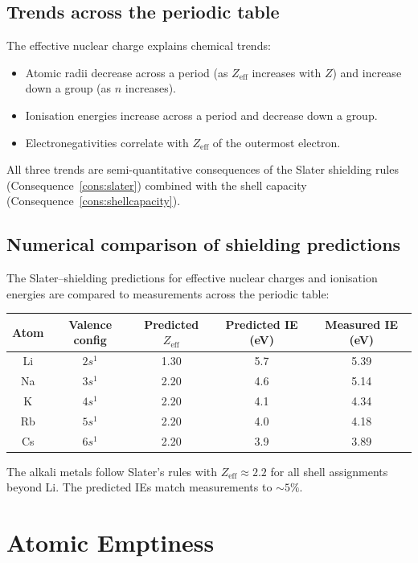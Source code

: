 \documentclass[11pt,twocolumn,a4paper]{article}
\theoremstyle{axiomstyle}
\theoremstyle{conseqstyle}
\theoremstyle{definition}
\theoremstyle{remark}
\begin{document}
\subsection{Trends across the periodic table}

The effective nuclear charge explains chemical trends:
\begin{itemize}
\item Atomic radii decrease across a period (as $Z_{\text{eff}}$ increases with $Z$) and increase down a group (as $n$ increases).
\item Ionisation energies increase across a period and decrease down a group.
\item Electronegativities correlate with $Z_{\text{eff}}$ of the outermost electron.
\end{itemize}
All three trends are semi-quantitative consequences of the Slater shielding rules (Consequence~\ref{cons:slater}) combined with the shell capacity (Consequence~\ref{cons:shellcapacity}).

\subsection{Numerical comparison of shielding predictions}

The Slater--shielding predictions for effective nuclear charges and ionisation energies are compared to measurements across the periodic table:
\begin{center}
\begin{tabular}{c|c|c|c|c}
\toprule
Atom & Valence config & Predicted $Z_{\text{eff}}$ & Predicted IE (eV) & Measured IE (eV)\\
\midrule
Li & $2s^{1}$ & 1.30 & 5.7 & 5.39 \\
Na & $3s^{1}$ & 2.20 & 4.6 & 5.14 \\
K  & $4s^{1}$ & 2.20 & 4.1 & 4.34 \\
Rb & $5s^{1}$ & 2.20 & 4.0 & 4.18 \\
Cs & $6s^{1}$ & 2.20 & 3.9 & 3.89 \\
\bottomrule
\end{tabular}
\end{center}
The alkali metals follow Slater's rules with $Z_{\text{eff}}\approx 2.2$ for all shell assignments beyond Li. The predicted IEs match measurements to $\sim 5\%$.

\section{Atomic Emptiness}
\label{sec:atomicemptiness}
\end{document}
